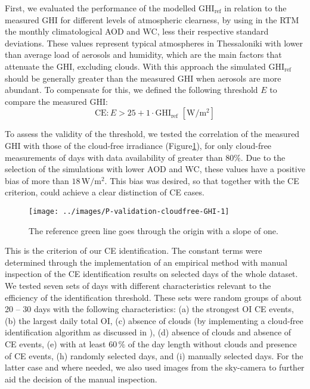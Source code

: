 \documentclass[preprint, 5p,
authoryear]{elsarticle} %
\begin{document}
First, we evaluated the performance of the modelled
\(\text{GHI}_\text{ref}\) in relation to the measured GHI for different
levels of atmospheric clearness, by using in the RTM the monthly
climatological AOD and WC, less their respective standard deviations.
These values represent typical atmospheres in Thessaloniki with lower
than average load of aerosols and humidity, which are the main factors
that attenuate the GHI, excluding clouds. With this approach the
simulated \(\text{GHI}_\text{ref}\) should be generally greater than the
measured GHI when aerosols are more abundant. To compensate for this, we
defined the following threshold \(E\) to compare the measured
\(\text{GHI}\): \begin{equation}
\text{CE} : E > 25 + 1 \cdot \text{GHI}_\text{ref} \,\,[\text{W}/\text{m}^2] \label{eq:CE4}
\end{equation}

To assess the validity of the threshold, we tested the correlation of
the measured GHI with those of the cloud-free irradiance
(Figure\nobreakspace{}\ref{fig:validation-GHI}), for only cloud-free
measurements of days with data availability of greater than 80\%. Due to
the selection of the simulations with lower AOD and WC, these values
have a positive bias of more than \(18\,\text{W}/\text{m}^2\). This bias
was desired, so that together with the CE criterion, could achieve a
clear distinction of CE cases.

\begin{figure}[H]

{\centering \texttt{[image: ../images/P-validation-cloudfree-GHI-1]} 

}

\caption{The reference green line goes through the origin with a slope of one.}\label{fig:validation-GHI}
\end{figure}

This is the criterion of our CE identification. The constant terms were
determined through the implementation of an empirical method with manual
inspection of the CE identification results on selected days of the
whole dataset. We tested seven sets of days with different
characteristics relevant to the efficiency of the identification
threshold. These sets were random groups of about 20 -- 30 days with the
following characteristics: (a) the strongest OI CE events, (b) the
largest daily total OI, (c) absence of clouds (by implementing a
cloud-free identification algorithm as discussed in \citet{Natsis2023}),
(d) absence of clouds and absence of CE events, (e) with at least
\(60\,\%\) of the day length without clouds and presence of CE events,
(h) randomly selected days, and (i) manually selected days. For the
latter case and where needed, we also used images from the sky-camera to
further aid the decision of the manual inspection.
\end{document}
